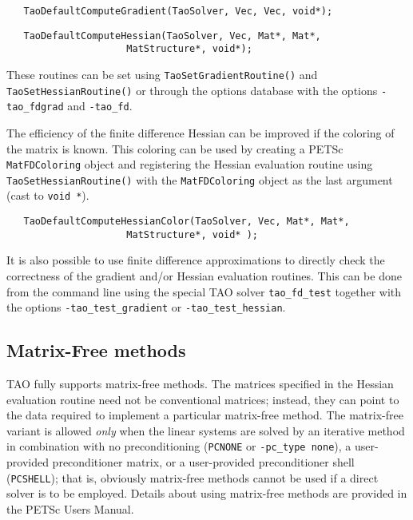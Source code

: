 \begin{verbatim}
   TaoDefaultComputeGradient(TaoSolver, Vec, Vec, void*);
\end{verbatim}


\begin{verbatim}
   TaoDefaultComputeHessian(TaoSolver, Vec, Mat*, Mat*, 
                     MatStructure*, void*);
\end{verbatim}
\noindent
These routines can be set using {\tt TaoSetGradientRoutine()} and 
{\tt TaoSetHessianRoutine()} or through the options database with the
options {\tt -tao\_fdgrad} and {\tt -tao\_fd}.

The efficiency of the finite difference Hessian can be improved if the
coloring of the matrix is known.  This coloring can be used by creating a
PETSc {\tt MatFDColoring} object and registering the Hessian evaluation routine 
using
{\tt TaoSetHessianRoutine()} with the {\tt MatFDColoring} object as
the last argument (cast to {\tt void *}).
\begin{verbatim}
   TaoDefaultComputeHessianColor(TaoSolver, Vec, Mat*, Mat*, 
                     MatStructure*, void* );
\end{verbatim}

It is also possible to use finite difference approximations to directly check
the correctness of the gradient and/or Hessian evaluation routines.
This can be done from the command line using the special TAO solver 
{\tt tao\_fd\_test} together with the options
{\tt -tao\_test\_gradient} or {\tt -tao\_test\_hessian}.

\subsection{Matrix-Free methods}
TAO fully supports matrix-free methods. The matrices specified in the
Hessian evaluation routine need not be conventional
matrices; instead, they can point to the data required to implement a
particular matrix-free method.  The matrix-free variant is allowed
{\em only} when the linear systems are solved by an iterative method
in combination with no preconditioning ({\tt PCNONE} or {\tt -pc\_type none}),
a user-provided preconditioner matrix, or a user-provided preconditioner
shell ({\tt PCSHELL}); that is,
obviously matrix-free methods cannot be used if a direct solver is to 
be employed.  %
Details about using matrix-free methods are provided in the
PETSc  Users Manual.


